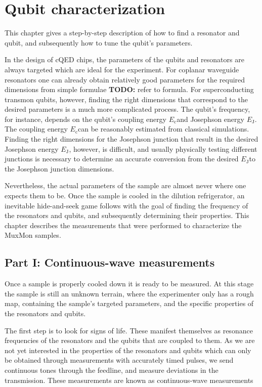\documentclass[12pt]{report}
\newcommand{\Ec}{$E_\text{c}$}
\newcommand{\Ej}{$E_\text{J}$}
\begin{document}
  \chapter{Qubit characterization}
    \begin{description}
     \item This chapter gives a step-by-step description of how to find a resonator and qubit, and subsequently how to tune the qubit's parameters.
     \end{description}

    In the design of cQED chips, the parameters of the qubits and resonators are always targeted which are ideal for the experiment.
    For coplanar waveguide resonators one can already obtain relatively good parameters for the required dimensions from simple formulae \textbf{TODO:} refer to formula.
    For superconducting transmon qubits, however, finding the right dimensions that correspond to the desired parameters is a much more complicated process.
    The qubit's frequency, for instance, depends on the qubit's coupling energy \Ec and Josephson energy \Ej. The coupling energy \Ec can be reasonably estimated from classical simulations. Finding the right dimensions for the Josephson junction that result in the desired Josephson energy \Ej, however, is difficult, and usually physically testing different junctions is necessary to determine an accurate conversion from the desired \Ej to the Josephson junction dimensions.

    Nevertheless, the actual parameters of the sample are almost never where one expects them to be. Once the sample is cooled in the dilution refrigerator, an inevitable hide-and-seek game follows with the goal of finding the frequency of the resonators and qubits, and subsequently determining their properties. This chapter describes the measurements that were performed to characterize the MuxMon samples.

    \section{Part I: Continuous-wave measurements}

      Once a sample is properly cooled down it is ready to be measured. At this stage the sample is still an unknown terrain, where the experimenter only has a rough map, containing the sample's targeted parameters, and the specific properties of the resonators and qubits.

      The first step is to look for signs of life. These manifest themselves as resonance frequencies of the resonators and the qubits that are coupled to them. As we are not yet interested in the properties of the resonators and qubits which can only be obtained through measurements with accurately timed pulses, we send continuous tones through the feedline, and measure deviations in the transmission. These measurements are known as continuous-wave measurements
\end{document}
